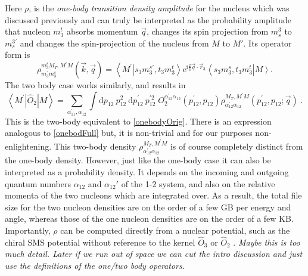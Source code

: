 \documentclass[a4paper,11pt]{article}
\newcommand\bv[1]{\vec{#1}}
\newcommand{\ques}[1]{\color{red}\textit{ #1 }\color{black}}
\begin{document}
Here $\rho$, is the \textit{one-body transition density amplitude}
for the nucleus which was discussed previously and can truly be
interpreted as the probability amplitude that nucleon $m_3^t$ absorbs
momentum $\bv{q}$, changes its spin projection from $m_s^3$ to
$m_s^{3'}$ and changes the spin-projection of the nucleus from $M$ to
$M'$. Its operator form is
\begin{equation}
  \rho_{m_{3}^{\prime} m_{3}^{s}}^{m_{3}^{t} M_{T}, M^{\prime}
  M}(\bv{k}, \bv{q})=\left\langle M^{\prime}\right.\left|s_{3}
  m_{3}^{s \prime}, t_{3} m_{3}^{t}\right\rangle
  \mathrm{e}^{\mathrm{i} \frac{2}{3} \bv{q} \cdot
  \bv{r}_{3}}\left\langle s_{3} m_{3}^{s}, t_{3}
  m_{3}^{t}\right|\left. M\right\rangle\label{onebodydens}.
\end{equation}
The two body case works similarly, and results in
\begin{equation}
  \left\langle M^{\prime}\left|\hat{O}_{2}\right| M\right\rangle =
  \sum_{\alpha_{11}^{\prime}, \alpha_{12}} \int \mathrm{d} p_{12}\:
  p_{12}^{2} \mathrm{~d} p_{12}^{\prime}\: p_{12}^{\prime 2}\;
  O_{2}^{\alpha_{12}^{\prime} \alpha_{12}}\left(p_{12}^{\prime},
  p_{12}\right) \rho_{\alpha_{12}^{\prime} \alpha_{12}}^{M_{T},
  M^{\prime} M}\left(p_{12}^{\prime}, p_{12} ; \bv{q}\right)\label{twobody}\;.
\end{equation}
This is the two-body equivalent to \eqref{onebodyOrig}.
There is an expression analogous to \eqref{onebodFull} but, it is non-trivial and for our purposes non-enlightening.
This two-body density $\rho_{\alpha_{12}^{\prime}
\alpha_{12}}^{M_{T}, M^{\prime} M}$ is of course completely distinct
from the one-body density. 
However, just like the one-body case it can also be interpreted as a probability density.
It depends on the incoming and outgoing quantum numbers
$\alpha_{12}$ and $\alpha_{12}'$ of the 1-2 system, and also on the
relative momenta of the two nucleons which are integrated over.
As a result, the total file size for the two nucleon densities are on
the order of a few GB per energy and angle, whereas those of the one
nucleon densities are on the order of a few KB.
Importantly, $\rho$ can be computed directly from a nuclear
potential, such as the chiral SMS potential
without reference to the kernel $\hat{O}_3$ or $\hat{O}_{2}$
\cite{Reinert2018}.
\ques{Maybe this is too much detail. Later if we run out of space we can cut the intro discussion and just use the definitions
of the one/two body operators.}
\end{document}
